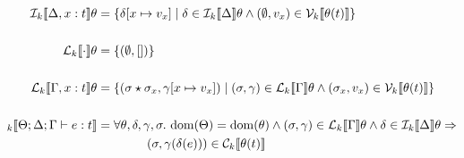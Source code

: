 \begin{align*}
    \den{I}{k}{ \Delta, x : t } \theta &= \{ \delta[x \mapsto v_x ] \mid \delta \in \den{I}{k}{\Delta}\theta \wedge (\empH, v_x) \in \V{k}{\theta(t)} \} \\
\\
    \den{L}{k}{ \cdot } \theta &= \{ (\empH, []) \} \\
\\
    \den{L}{k}{ \Gamma, x : t } \theta &= \{ (\sigma \star \sigma_x, \gamma[x \mapsto v_x ]) \mid (\sigma, \gamma) \in \den{L}{k}{\Gamma}\theta \wedge (\sigma_x, v_x) \in \V{k}{\theta(t)} \} \\
\\
\den{}{k}{ \Theta; \Delta ; \Gamma \vdash e : t } &= \forall \theta, \delta, \gamma, \sigma.\ \dom(\Theta) = \dom(\theta) \wedge (\sigma, \gamma) \in \den{L}{k}{ \Gamma }\theta \wedge \delta \in \den{I}{k}{ \Delta }\theta \Rightarrow \\
                                                 & \qquad \qquad (\sigma, \gamma(\delta(e))) \in \C{k}{ \theta(t) }
\end{align*}
